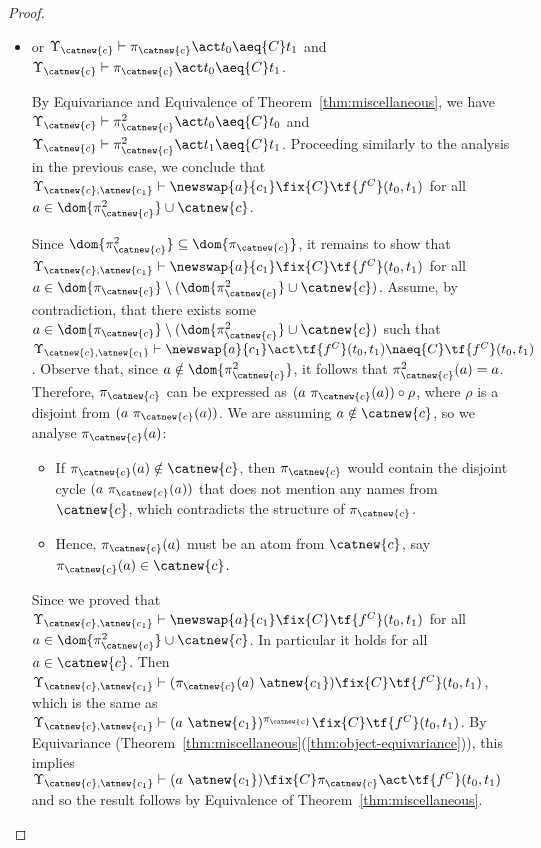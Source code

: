 \begin{proof}
\begin{itemize}
\begin{description}
\begin{itemize}
                \item or $\Upsilon_{\catnew{c}} \vdash \pi_{\catnew{c}}\act t_0 \aeq{C} t_1$ and $\Upsilon_{\catnew{c}} \vdash \pi_{\catnew{c}}\act t_0 \aeq{C} t_1$.

                By Equivariance and Equivalence of Theorem~\ref{thm:miscellaneous}, we have $\Upsilon_{\catnew{c}} \vdash \pi_{\catnew{c}}^2\act t_0 \aeq{C} t_0$ and  $\Upsilon_{\catnew{c}} \vdash \pi_{\catnew{c}}^2\act t_1 \aeq{C} t_1$. Proceeding similarly to the analysis in the previous case, we conclude that $\Upsilon_{\catnew{c},\atnew{c_1}} \vdash\newswap{a}{c_1}\fix{C} \tf{f^C}(t_0,t_1)$ for all $a\in \dom{\pi_{\catnew{c}}^2}\cup\catnew{c}$.

                Since $\dom{\pi_{\catnew{c}}^2} \subseteq \dom{\pi_{\catnew{c}}}$, it remains to show that $\Upsilon_{\catnew{c},\atnew{c_1}} \vdash \newswap{a}{c_1}\fix{C} \tf{f^C}(t_0,t_1)$ for all $a \in \dom{\pi_{\catnew{c}}} \setminus (\dom{\pi_{\catnew{c}}^2} \cup \catnew{c})$. Assume, by contradiction, that there exists some $a \in \dom{\pi_{\catnew{c}}} \setminus (\dom{\pi_{\catnew{c}}^2} \cup \catnew{c})$ such that $\Upsilon_{\catnew{c},\atnew{c_1}} \vdash \newswap{a}{c_1}\act \tf{f^C}(t_0,t_1)\naeq{C} \tf{f^C}(t_0,t_1)$. Observe that, since $a \notin \dom{\pi_{\catnew{c}}^2}$, it follows that $\pi_{\catnew{c}}^2(a) = a$. Therefore, $\pi_{\catnew{c}}$ can be expressed as $(a \ \pi_{\catnew{c}}(a)) \circ \rho$, where $\rho$ is a  disjoint from $(a \ \pi_{\catnew{c}}(a))$. We are assuming $a \notin \catnew{c}$, so we analyse $\pi_{\catnew{c}}(a)$:
                \begin{itemize}
                    \item If $\pi_{\catnew{c}}(a) \notin \catnew{c}$, then $\pi_{\catnew{c}}$ would contain the disjoint cycle $(a \ \pi_{\catnew{c}}(a))$ that does not mention any names from $\catnew{c}$, which contradicts the structure of $\pi_{\catnew{c}}$.

                    \item Hence, $\pi_{\catnew{c}}(a)$ must be an atom from $\catnew{c}$, say $\pi_{\catnew{c}}(a) \in \catnew{c}$.
                \end{itemize}
                Since we proved that $\Upsilon_{\catnew{c},\atnew{c_1}} \vdash \newswap{a}{c_1}\fix{C} \tf{f^C}(t_0,t_1)$ for all $a\in \dom{\pi_{\catnew{c}}^2}\cup\catnew{c}$.  In particular it holds for all $a\in \catnew{c}$. Then $ \Upsilon_{\catnew{c},\atnew{c_1}} \vdash (\pi_{\catnew{c}}(a) \ \atnew{c_1})\fix{C}\tf{f^C}(t_0,t_1)$, which is the same as $\Upsilon_{\catnew{c},\atnew{c_1}} \vdash (a \ \atnew{c_1})^{\pi_{\catnew{c}}}\fix{C}\tf{f^C}(t_0,t_1)$. By Equivariance (Theorem~\ref{thm:miscellaneous}(\ref{thm:object-equivariance})), this implies $\Upsilon_{\catnew{c},\atnew{c_1}} \vdash (a \ \atnew{c_1})\fix{C}\pi_{\catnew{c}}\act\tf{f^C}(t_0,t_1)$ and so the result follows by Equivalence of Theorem~\ref{thm:miscellaneous}.
            \end{itemize}


\end{description}
\end{itemize}
\end{proof}
